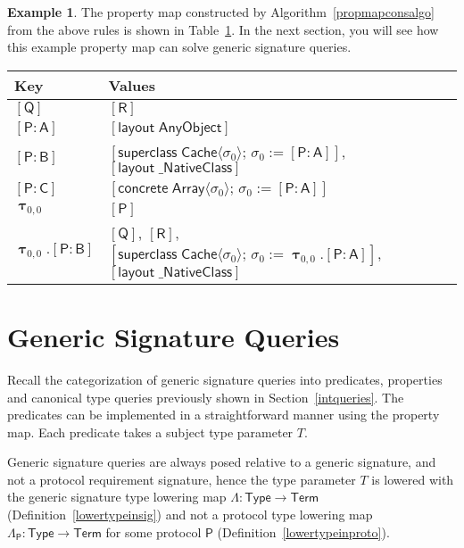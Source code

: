\documentclass[a4paper,headsepline,bibliography=totoc,toc=flat,fleqn,twoside=semi]{scrbook}
\theoremstyle{definition}
\theoremstyle{definition}
\newtheorem{example}{Example}[chapter]
\theoremstyle{definition}
\newcommand{\namesym}[1]{\mathsf{#1}}
\newcommand{\proto}[1]{\bm{\mathsf{#1}}}
\newcommand{\protosym}[1]{[\proto{#1}]}
\newcommand{\genericsym}[2]{\bm{\uptau}_{#1,#2}}
\newcommand{\assocsym}[2]{[\proto{#1}\colon\namesym{#2}]}
\newcommand{\layoutsym}[1]{[\mathsf{layout\;#1}]}
\newcommand{\supersym}[1]{[\mathsf{superclass}\;#1]}
\newcommand{\concretesym}[1]{[\mathsf{concrete}\;#1]}
\begin{document}
\begin{example}
The property map constructed by Algorithm~\ref{propmapconsalgo} from the above rules is shown in Table~\ref{propmapexample3table}.
In the next section, you will see how this example property map can solve generic signature queries.
\begin{table}\label{propmapexample3table}
\begin{center}
\begin{tabular}{|l|l|}
\hline
Key&Values\\
\hline
\hline
$\protosym{Q}$&$\protosym{R}$\\
$\assocsym{P}{A}$&$\layoutsym{AnyObject}$\\
$\assocsym{P}{B}$&$\supersym{\namesym{Cache}\langle\sigma_0\rangle;\,\sigma_0:=\assocsym{P}{A}}$, $\layoutsym{\_NativeClass}$\\
$\assocsym{P}{C}$&$\concretesym{\namesym{Array}\langle\sigma_0\rangle;\,\sigma_0:=\assocsym{P}{A}}$\\
$\genericsym{0}{0}$&$\protosym{P}$\\
$\genericsym{0}{0}.\assocsym{P}{B}$&$\protosym{Q}$, $\protosym{R}$, $\supersym{\namesym{Cache}\langle\sigma_0\rangle;\,\sigma_0:=\genericsym{0}{0}.\assocsym{P}{A}}$, $\layoutsym{\_NativeClass}$\\
\hline
\end{tabular}
\end{center}
\end{table}
\end{example}

\section{Generic Signature Queries}\label{implqueries}

Recall the categorization of generic signature queries into predicates, properties and canonical type queries previously shown in Section~\ref{intqueries}. The predicates can be implemented in a straightforward manner using the property map. Each predicate takes a subject type parameter $T$.

Generic signature queries are always posed relative to a generic signature, and not a protocol requirement signature, hence the type parameter $T$ is lowered with the generic signature type lowering map $\Lambda\colon\namesym{Type}\rightarrow\namesym{Term}$ (Definition~\ref{lowertypeinsig}) and not a protocol type lowering map $\Lambda_{\proto{P}}\colon\namesym{Type}\rightarrow\namesym{Term}$ for some protocol $\proto{P}$ (Definition~\ref{lowertypeinproto}).
\end{document}
